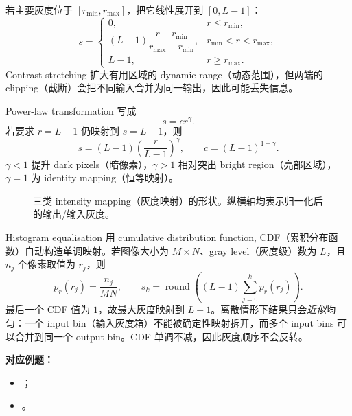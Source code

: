 

若主要灰度位于 $[r_{\min},r_{\max}]$，把它线性展开到 $[0,L-1]$：
\[
  s=
  \begin{cases}
    0, & r\le r_{\min},\\[2pt]
    (L-1)\dfrac{r-r_{\min}}{r_{\max}-r_{\min}},
      & r_{\min}<r<r_{\max},\\[7pt]
    L-1, & r\ge r_{\max}.
  \end{cases}
\]
Contrast stretching 扩大有用区域的 dynamic range（动态范围），但两端的 clipping（截断）会把不同输入合并为同一输出，因此可能丢失信息。

Power-law transformation 写成
\[
  s=cr^\gamma.
\]
若要求 $r=L-1$ 仍映射到 $s=L-1$，则
\[
  \boxed{s=(L-1)\left(\frac{r}{L-1}\right)^\gamma},
  \qquad c=(L-1)^{1-\gamma}.
\]
$\gamma<1$ 提升 dark pixels（暗像素），$\gamma>1$ 相对突出 bright region（亮部区域），$\gamma=1$ 为 identity mapping（恒等映射）。

\begin{figure}[htbp]
  \centering
  \resizebox{0.9\textwidth}{!}{}
  \caption{三类 intensity mapping（灰度映射）的形状。纵横轴均表示归一化后的输出/输入灰度。}
  \label{fig:sc4061-l03-intensity-mappings}
\end{figure}

Histogram equalisation 用 cumulative distribution function, CDF（累积分布函数）自动构造单调映射。若图像大小为 $M\times N$、gray level（灰度级）数为 $L$，且 $n_j$ 个像素取值为 $r_j$，则
\[
  p_r(r_j)=\frac{n_j}{MN},
  \qquad
  \boxed{s_k=\operatorname{round}\!\left((L-1)\sum_{j=0}^{k}p_r(r_j)\right)}.
\]
最后一个 CDF 值为 $1$，故最大灰度映射到 $L-1$。离散情形下结果只会\emph{近似}均匀：一个 input bin（输入灰度箱）不能被确定性映射拆开，而多个 input bins 可以合并到同一个 output bin。CDF 单调不减，因此灰度顺序不会反转。

\textbf{对应例题：}
\begin{itemize}
  \item {}；
  \item {}。
\end{itemize}


